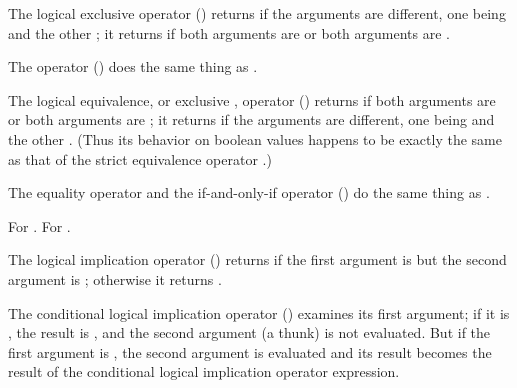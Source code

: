 The logical exclusive  operator \EXP{\xor} () returns  if
the arguments are different, one being  and the other ; it returns
 if both arguments are  or both arguments are .

The operator \EXP{\oplus} () does the same thing as \EXP{\xor}.


The logical equivalence, or exclusive , operator \EXP{\equiv} () returns  if
both arguments are  or both arguments are ; it returns  if
the arguments are different, one being  and the other .
(Thus its behavior on boolean values happens to be exactly the same as that of the strict equivalence operator \EXP{\sequiv}.)

The equality operator \EXP{=} and the if-and-only-if operator \EXP{\leftrightarrow} () do the same thing as \EXP{\equiv}.

For \EXP{\not\equiv} .
For \EXP{\neq} .





The logical implication operator \EXP{\rightarrow} () returns  if the first argument
is  but the second argument is ; otherwise it returns .

The conditional logical implication operator \EXP{\rightarrow\COLONOP} () examines its first argument;
if it is , the result is , and the second argument (a thunk) is not evaluated.
But if the first argument is , the second argument is evaluated and its result becomes
the result of the conditional logical implication operator expression.


